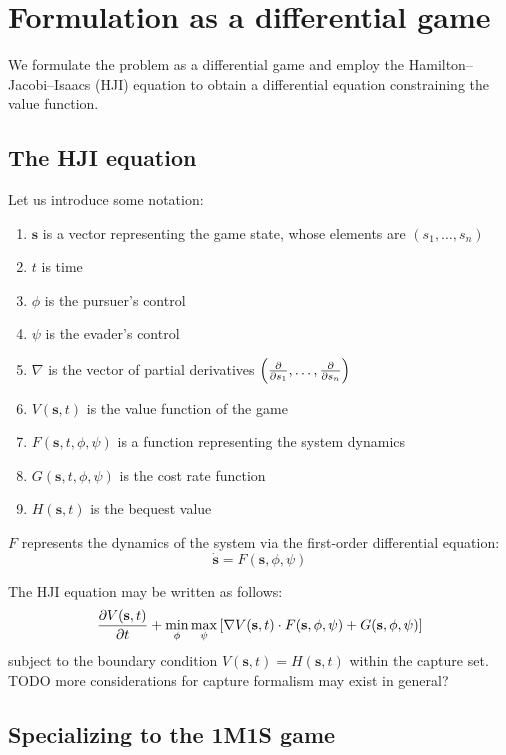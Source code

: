 \documentclass{article}
\renewcommand{\vec}[1]{\mathbf{#1}}
\begin{document}
\section{Formulation as a differential game}

We formulate the problem as a differential game and employ the
Hamilton--Jacobi--Isaacs (HJI) equation to obtain a differential equation constraining
the value function.

\subsection{The HJI equation}

Let us introduce some notation:
\begin{enumerate}
\item $\vec{s}$ is a vector representing the game state, whose elements are
$(s_1, \dots, s_n)$
\item $t$ is time
\item $\phi$ is the pursuer's control
\item $\psi$ is the evader's control
\item $\nabla$ is the vector of partial derivatives $\left(\pdv{}{s_1}, \dots,
\pdv{}{s_n}\right)$
\item $V(\vec{s}, t)$ is the value function of the game
\item $F(\vec{s}, t, \phi, \psi)$ is a function representing the system dynamics
\item $G(\vec{s}, t, \phi, \psi)$ is the cost rate function
\item $H(\vec{s}, t)$ is the bequest value
\end{enumerate}

$F$ represents the dynamics of the system via the first-order differential
equation:
\begin{equation}
\dot{\vec{s}} = F(\vec{s}, \phi, \psi)
\end{equation}

The HJI equation may be written as follows:
\begin{align}
\pdv{V(\vec{s}, t)}{t} + \min_{\phi} \max_{\psi} \left[
  \nabla V(\vec{s}, t) \cdot F(\vec{s}, \phi, \psi) + G(\vec{s}, \phi, \psi)
\right]
\end{align}
subject to the boundary condition $V(\vec{s}, t) = H(\vec{s}, t)$ within the
capture set.
TODO more considerations for capture formalism may exist in general?

\subsection{Specializing to the 1M1S game}
\end{document}
